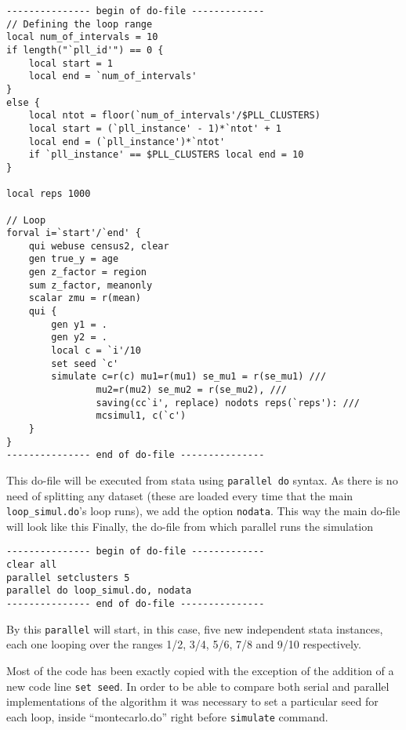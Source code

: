 \documentclass[letterpaper, 10pt]{article}
\begin{document}
\begin{Verbatim}[tabsize=4, fontsize=\footnotesize]
--------------- begin of do-file -------------
// Defining the loop range
local num_of_intervals = 10
if length("`pll_id'") == 0 {
	local start = 1
	local end = `num_of_intervals'
}
else {
	local ntot = floor(`num_of_intervals'/$PLL_CLUSTERS)
	local start = (`pll_instance' - 1)*`ntot' + 1
	local end = (`pll_instance')*`ntot'
	if `pll_instance' == $PLL_CLUSTERS local end = 10
}

local reps 1000

// Loop
forval i=`start'/`end' {
	qui webuse census2, clear
	gen true_y = age
	gen z_factor = region
	sum z_factor, meanonly
	scalar zmu = r(mean)
	qui {
		gen y1 = .
		gen y2 = .
		local c = `i'/10
		set seed `c'
		simulate c=r(c) mu1=r(mu1) se_mu1 = r(se_mu1) ///
				mu2=r(mu2) se_mu2 = r(se_mu2), /// 
				saving(cc`i', replace) nodots reps(`reps'): ///
				mcsimul1, c(`c')
	}
}
--------------- end of do-file ---------------
\end{Verbatim}
\bigskip

\noindent This do-file will be executed from stata using {\tt parallel do} syntax. As there is no need of splitting any dataset (these are loaded every time that the main {\tt loop\_simul.do}'s loop runs), we add the option {\tt nodata}. This way the main do-file will look like this
Finally, the do-file from which parallel runs the simulation
\bigskip

\begin{Verbatim}[tabsize=4, fontsize=\footnotesize]
--------------- begin of do-file -------------
clear all
parallel setclusters 5
parallel do loop_simul.do, nodata
--------------- end of do-file ---------------
\end{Verbatim}
\bigskip

By this {\tt parallel} will start, in this case, five new independent stata instances, each one looping over the ranges 1/2, 3/4, 5/6, 7/8 and 9/10 respectively.

Most of the code has been exactly copied with the exception of the addition of a new code line {\tt set seed}. In order to be able to compare both serial and parallel implementations of the algorithm it was necessary to set a particular seed for each loop, inside ``montecarlo.do'' right before {\tt simulate} command.
\end{document}
